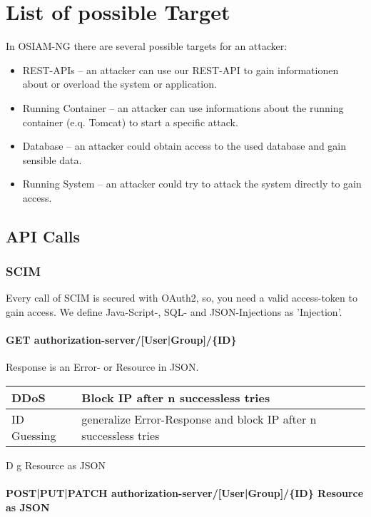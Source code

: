 \section{List of possible Target}
In OSIAM-NG there are several possible targets for an attacker:
\begin{itemize}
\item REST-APIs -- an attacker can use our REST-API to gain informationen about or overload the system or application.
\item Running Container -- an attacker can use informations about the running container (e.q. Tomcat) to start a specific attack.
\item Database -- an attacker could obtain access to the used database and gain sensible data.
\item Running System -- an attacker could try to attack the system directly to gain access.
\end{itemize}

\subsection{API Calls}
\subsubsection{SCIM}
Every call of SCIM is secured with OAuth2, so, you need a valid access-token to gain access. We define Java-Script-, SQL- and JSON-Injections as 'Injection'.

\paragraph{GET authorization-server/[User|Group]/\{ID\}}

Response is an Error- or Resource in JSON.

\begin{tabular}{|l|l|}
    \hline
    DDoS & Block IP after n successless tries\\
    \hline
    ID Guessing & generalize Error-Response and block IP after n successless tries\\

    \hline
 \end{tabular}

D
g
Resource as JSON\paragraph{POST|PUT|PATCH authorization-server/[User|Group]/\{ID\} Resource as JSON} 

